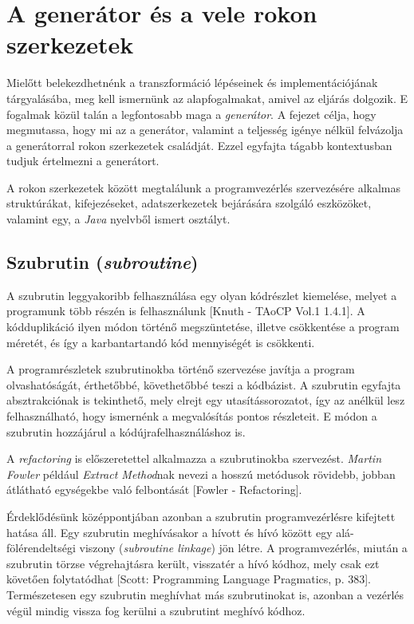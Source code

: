 \chapter{A generátor és a vele rokon szerkezetek}

Mielőtt belekezdhetnénk a transzformáció lépéseinek és implementációjának tárgyalásába, meg kell ismernünk az alapfogalmakat, amivel az eljárás dolgozik. E fogalmak közül talán a legfontosabb maga a \textit{generátor}. A fejezet célja, hogy megmutassa, hogy mi az a generátor, valamint a teljesség igénye nélkül felvázolja a generátorral rokon szerkezetek családját. Ezzel egyfajta tágabb kontextusban tudjuk értelmezni a generátort.

A rokon szerkezetek között megtalálunk a programvezérlés szervezésére alkalmas struktúrákat, kifejezéseket, adatszerkezetek bejárására szolgáló eszközöket, valamint egy, a \textit{Java} nyelvből ismert osztályt. 

\section{Szubrutin (\textit{subroutine})}

A szubrutin leggyakoribb felhasználása egy olyan kódrészlet kiemelése, melyet a programunk több részén is felhasználunk [Knuth - TAoCP Vol.1 1.4.1]. A kódduplikáció ilyen módon történő megszüntetése, illetve csökkentése a program méretét, és így a karbantartandó kód mennyiségét is csökkenti. 

A programrészletek szubrutinokba történő szervezése javítja a program olvashatóságát, érthetőbbé, követhetőbbé teszi a kódbázist. A szubrutin egyfajta absztrakciónak is tekinthető, mely elrejt egy utasítássorozatot, így az anélkül lesz felhasználható, hogy ismernénk a megvalósítás pontos részleteit. E módon a szubrutin hozzájárul a kódújrafelhasználáshoz is.

A \textit{refactoring} is előszeretettel alkalmazza a szubrutinokba szervezést. \textit{Martin Fowler} például \textit{Extract Method}nak nevezi a hosszú metódusok rövidebb, jobban átlátható egységekbe való felbontását [Fowler - Refactoring].

Érdeklődésünk középpontjában azonban a szubrutin programvezérlésre kifejtett hatása áll. Egy szubrutin meghívásakor a hívott és hívó között egy alá-fölérendeltségi viszony (\textit{subroutine linkage}) jön létre. A programvezérlés, miután a szubrutin törzse végrehajtásra került, visszatér a hívó kódhoz, mely csak ezt követően folytatódhat [Scott: Programming Language Pragmatics, p. 383]. Természetesen egy szubrutin meghívhat más szubrutinokat is, azonban a vezérlés végül mindig vissza fog kerülni a szubrutint meghívó kódhoz.

